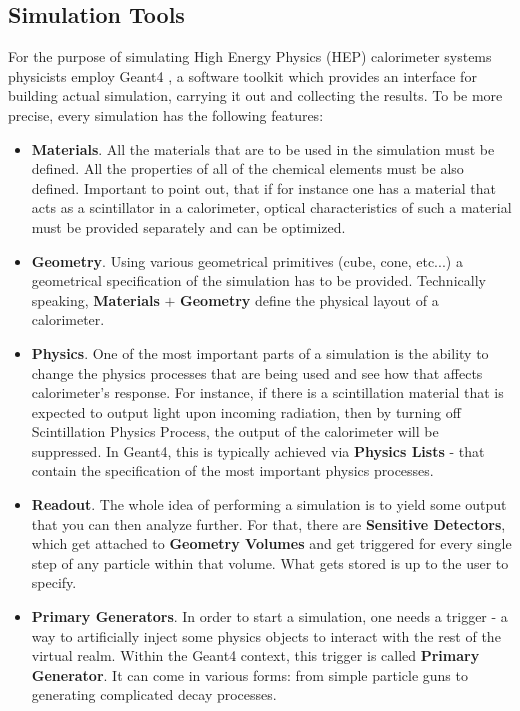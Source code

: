 \subsection{Simulation Tools} \label{subsection:simulations_introduction_geant4}
For the purpose of simulating High Energy Physics (HEP) calorimeter systems physicists employ {\sc Geant4} \cite{Geant4-1,Geant4-2}, a software toolkit which provides an interface for building actual simulation, carrying it out and collecting the results. To be more precise, every simulation has the following features:
\begin{itemize}
    \item \textbf{Materials}. All the materials that are to be used in the simulation must be defined. All the properties of all of the chemical elements must be also defined. Important to point out, that if for instance one has a material that acts as a scintillator in a calorimeter, optical characteristics of such a material must be provided separately and can be optimized.
    \item \textbf{Geometry}. Using various geometrical primitives (cube, cone, etc...) a geometrical specification of the simulation has to be provided. Technically speaking, \textbf{Materials} $+$ \textbf{Geometry} define the physical layout of a calorimeter.
    \item \textbf{Physics}. One of the most important parts of a simulation is the ability to change the physics processes that are being used and see how that affects calorimeter's response. For instance, if there is a scintillation material that is expected to output light upon incoming radiation, then by turning off Scintillation Physics Process, the output of the calorimeter will be suppressed. In {\sc Geant4}, this is typically achieved via \textbf{Physics Lists} - that contain the specification of the most important physics processes.
    \item \textbf{Readout}. The whole idea of performing a simulation is to yield some output that you can then analyze further. For that, there are \textbf{Sensitive Detectors}, which get attached to \textbf{Geometry Volumes} and get triggered for every single step of any particle within that volume. What gets stored is up to the user to specify.
    \item \textbf{Primary Generators}. In order to start a simulation, one needs a trigger - a way to artificially inject some physics objects to interact with the rest of the virtual realm. Within the {\sc Geant4} context, this trigger is called \textbf{Primary Generator}. It can come in various forms: from simple particle guns to generating complicated decay processes.

\end{itemize}
